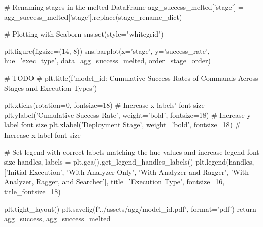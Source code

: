     # Renaming stages in the melted DataFrame
    agg_success_melted['stage'] = agg_success_melted['stage'].replace(stage_rename_dict)

    # Plotting with Seaborn
    sns.set(style="whitegrid")

    plt.figure(figsize=(14, 8))
    sns.barplot(x='stage', y='success_rate', hue='exec_type', data=agg_success_melted, order=stage_order)

    # TODO
    # plt.title(f'{model_id}: Cumulative Success Rates of Commands Across Stages and Execution Types')

    plt.xticks(rotation=0, fontsize=18)  # Increase x labels' font size
    plt.ylabel('Cumulative Success Rate', weight='bold', fontsize=18)  # Increase y label font size
    plt.xlabel('Deployment Stage', weight='bold', fontsize=18)  # Increase x label font size
    
    # Set legend with correct labels matching the hue values and increase legend font size
    handles, labels = plt.gca().get_legend_handles_labels()
    plt.legend(handles, ['Initial Execution', 'With Analyzer Only', 'With Analyzer and Ragger', 'With Analyzer, Ragger, and Searcher'], title='Execution Type', fontsize=16, title_fontsize=18)
    
    plt.tight_layout()
    plt.savefig(f'../assets/agg/{model_id}.pdf', format='pdf')
    return agg_success, agg_success_melted
